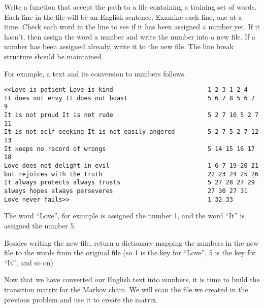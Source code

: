 \begin{problem}

Write a function that accept the path to a file containing a training set of words.
Each line in the file will be an English sentence.
Examine each line, one at a time.
Check each word in the line to see if it has been assigned a number yet.
If it hasn't, then assign the word a number and write the number into a new file.
If a number has been assigned already, write it to the new file.
The line break structure should be maintained.

For example, a text and its conversion to numbers follows.

\begin{lstlisting}
<<Love is patient Love is kind 							1 2 3 1 2 4 
It does not envy It does not boast 						5 6 7 8 5 6 7 9 
It is not proud It is not rude 							5 2 7 10 5 2 7 11 
It is not self-seeking It is not easily angered  		5 2 7 5 2 7 12 13 
It keeps no record of wrongs							5 14 15 16 17 18 
Love does not delight in evil							1 6 7 19 20 21 
but rejoices with the truth 							22 23 24 25 26 
It always protects always trusts 						5 27 28 27 29 
always hopes always perseveres 							27 30 27 31 
Love never fails>> 										1 32 33
\end{lstlisting}

The word ``Love'', for example is assigned the number 1, and the word ``It'' is assigned the number 5.

Besides writing the new file, return a dictionary mapping the numbers in the new file to the words from the original file (so 1 is the key for ``Love'', 5 is the key for ``It'', and so on)
\end{problem}

Now that we have converted our English text into numbers, it is time to build the transition matrix for the Markov chain.
We will scan the file we created in the previous problem and use it to create the matrix.

